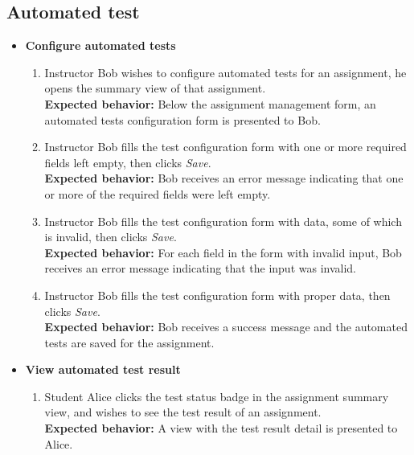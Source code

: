 \subsection{Automated test}
\begin{itemize}
    \item {\bf Configure automated tests} \begin{enumerate}
        \item Instructor Bob wishes to configure automated tests for an
            assignment, he opens the summary view of that assignment. \\
        {\bf Expected behavior:} Below the assignment management form, an
            automated tests configuration form is presented to Bob.

        \item Instructor Bob fills the test configuration form with one or more
            required fields left empty, then clicks \emph{Save}. \\
        {\bf Expected behavior:} Bob receives an error message indicating that
            one or more of the required fields were left empty.

        \item Instructor Bob fills the test configuration form with data, some
            of which is invalid, then clicks \emph{Save}. \\
        {\bf Expected behavior:} For each field in the form with invalid input,
            Bob receives an error message indicating that
            the input was invalid.

        \item Instructor Bob fills the test configuration form with proper data,
            then clicks \emph{Save}. \\
        {\bf Expected behavior:} Bob receives a success message and the automated
            tests are saved for the assignment.
    \end{enumerate}

    \item {\bf View automated test result} \begin{enumerate}
        \item Student Alice clicks the test status badge in the assignment
            summary view, and wishes to see the test result of an assignment. \\
        {\bf Expected behavior:} A view with the test result detail is
            presented to Alice.
    \end{enumerate}
\end{itemize}

